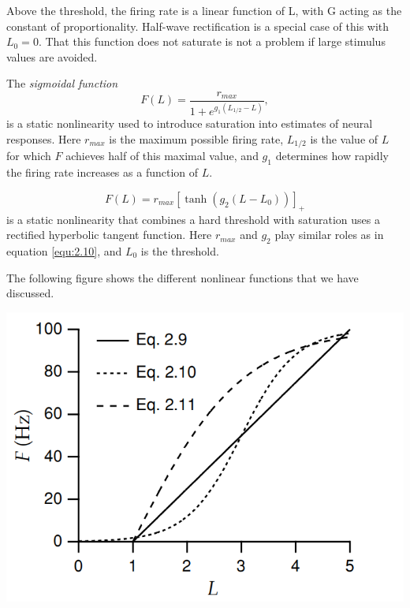 \begin{rem}
  Above the threshold, the firing rate is a linear function of L, with G acting as the constant of proportionality. Half-wave rectification is a special case of this with $L_0 = 0$. That this function does not saturate is not a problem if large stimulus values are avoided.
\end{rem}

\begin{exm}
  \label{sigmoidalFunction}
  The \emph{sigmoidal function}
  \begin{equation}
    \label{equ:2.10}
    F(L) = \frac{r_{max}}{1+e^{g_1(L_{1/2}-L)}},
  \end{equation}
  is a static nonlinearity used to introduce saturation into estimates of neural responses. Here $r_{max}$ is the maximum possible firing rate, $L_{1/2}$ is the value of $L$ for which $F$ achieves half of this maximal value, and $g_1$ determines how rapidly the firing rate increases as a function of $L$.
\end{exm}

\begin{exm}
  \begin{equation}
    \label{equ:2.11}
    F(L) = r_{max}[\tanh(g_2(L-L_0))]_+
  \end{equation}
  is a static nonlinearity that combines a hard threshold with saturation uses a rectified hyperbolic tangent function. Here $r_{max}$ and $g_2$ play similar roles as in equation \ref{equ:2.10}, and $L_0$ is the threshold.
\end{exm}

\begin{exm}
  The following figure shows the different nonlinear functions that we
  have discussed.
  \begin{center}
    \includegraphics[scale=0.3]{./png/NonlinearExample}
  \end{center}
\end{exm}

